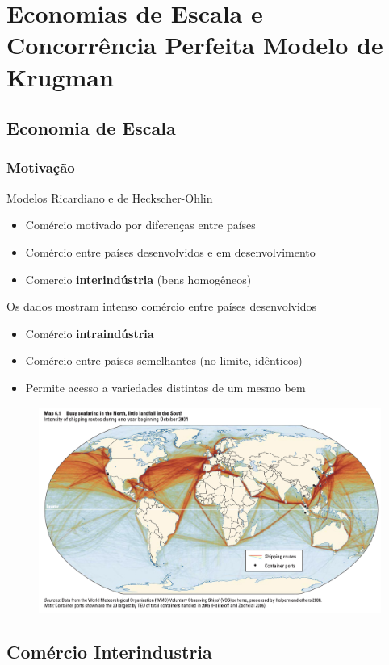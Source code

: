 \documentclass[a4paper,12pt]{article}[abntex2]
\begin{document}
\newpage
\section{\textbf{Economias de Escala e Concorrência Perfeita Modelo de Krugman}}
\subsection{\textbf{Economia de Escala}}
\subsubsection{\textbf{Motivação}}
Modelos Ricardiano e de Heckscher-Ohlin\begin{itemize}
    \item Comércio motivado por diferenças entre países
    \item Comércio entre países desenvolvidos e em desenvolvimento
    \item Comercio \textbf{interindústria}  (bens homogêneos)
\end{itemize}

Os dados mostram intenso comércio entre países desenvolvidos\begin{itemize}
    \item Comércio \textbf{intraindústria}
    \item Comércio entre países semelhantes (no limite, idênticos)
    \item Permite acesso a variedades distintas de um mesmo bem
\end{itemize}

\begin{figure}[H]
    \centering
    \includegraphics[width=0.7\linewidth]{Imagens/a16i1.png}
\end{figure}

\subsection{\textbf{Comércio Interindustria}}
\end{document}
